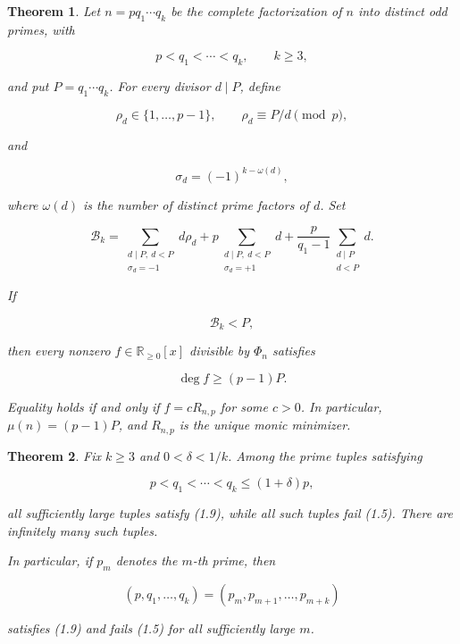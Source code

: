 \documentclass[11pt]{article}
\newtheorem{theorem}{Theorem}[section]
\numberwithin{equation}{section}
\begin{document}
\Needspace{0.28\textheight}
\begin{theorem}

Let \(n=pq_1\cdots q_k\) be the complete factorization of \(n\) into distinct
odd primes, with

\nopagebreak[4]
\[
p<q_1<\cdots<q_k,\qquad k\geq3,
\]

and put \(P=q_1\cdots q_k\). For every divisor \(d\mid P\), define

\nopagebreak[4]
\[
\rho_d\in\{1,\ldots,p-1\},
\qquad
\rho_d\equiv P/d\pmod p,
\tag{1.6}
\]

and

\nopagebreak[4]
\[
\sigma_d=(-1)^{k-\omega(d)},
\tag{1.7}
\]

where \(\omega(d)\) is the number of distinct prime factors of \(d\). Set

\nopagebreak[4]
\[
\mathcal B_k=
\sum_{\substack{d\mid P,\ d<P\\ \sigma_d=-1}}d\rho_d
+p\sum_{\substack{d\mid P,\ d<P\\ \sigma_d=+1}}d
+\frac{p}{q_1-1}\sum_{\substack{d\mid P\\d<P}}d.
\tag{1.8}
\]

If

\nopagebreak[4]
\[
\mathcal B_k<P,
\tag{1.9}
\]

then every nonzero \(f\in\mathbb R_{\geq0}[x]\) divisible by \(\Phi_n\)
satisfies

\nopagebreak[4]
\[
\deg f\geq(p-1)P.
\tag{1.10}
\]

Equality holds if and only if \(f=cR_{n,p}\) for some \(c>0\). In particular,
\(\mu(n)=(p-1)P\), and \(R_{n,p}\) is the unique monic minimizer.

\end{theorem}

\Needspace{0.28\textheight}
\begin{theorem}

Fix \(k\geq3\) and \(0<\delta<1/k\). Among the prime tuples satisfying

\nopagebreak[4]
\[
p<q_1<\cdots<q_k\leq(1+\delta)p,
\tag{1.11}
\]

all sufficiently large tuples satisfy (1.9), while all such tuples fail
(1.5). There are infinitely many such tuples.

In particular, if \(p_m\) denotes the \(m\)-th prime, then

\nopagebreak[4]
\[
(p,q_1,\ldots,q_k)
=(p_m,p_{m+1},\ldots,p_{m+k})
\tag{1.12}
\]

satisfies (1.9) and fails (1.5) for all sufficiently large \(m\).

\end{theorem}
\end{document}
